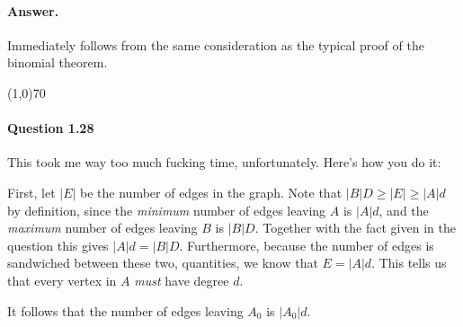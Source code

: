 \paragraph{Answer.} Immediately follows from the same consideration as the typical proof of the binomial theorem.

\begin{center}
	\line(1,0){70}
\end{center}

\paragraph{Question 1.28} This took me way too much fucking time, unfortunately. Here's how you do it:

First, let $|E|$ be the number of edges in the graph. Note that $|B|D\geq|E|\geq|A|d$ by definition, since the \textit{minimum} number of edges leaving $A$ is $|A|d$, and the \textit{maximum} number of edges leaving $B$ is $|B|D$. Together with the fact given in the question this gives $|A|d=|B|D$. Furthermore, because the number of edges is sandwiched between these two, quantities, we know that $E=|A|d$. This tells us that every vertex in $A$ \textit{must} have degree $d$.

It follows that the number of edges leaving $A_0$ is $|A_0|d$. 